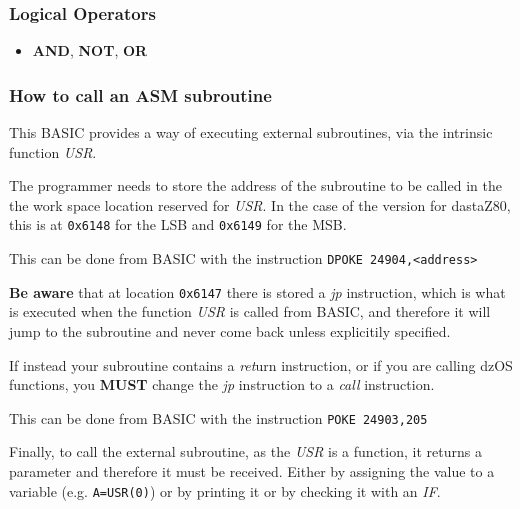         \subsubsection{Logical Operators}

        \begin{itemize}
            \item \textbf{AND}, \textbf{NOT}, \textbf{OR}
        \end{itemize}

        \subsubsection{How to call an ASM subroutine}

        This BASIC provides a way of executing external subroutines, via the
        intrinsic function \textit{USR}.

        The programmer needs to store the address of the subroutine to be called in
        the the work space location reserved for \textit{USR}. In the case of the
        version for dastaZ80, this is at \texttt{0x6148} for the LSB and
        \texttt{0x6149} for the MSB.

        This can be done from BASIC with the instruction \texttt{DPOKE 24904,<address>}

        \textbf{Be aware} that at location \texttt{0x6147} there is stored a
        \textit{jp} instruction, which is what is executed when the function
        \textit{USR} is called from BASIC, and therefore it will jump to the
        subroutine and never come back unless explicitily specified.

        If instead your subroutine contains a \textit{ret}urn instruction, or if you
        are calling dzOS functions, you \textbf{MUST} change the \textit{jp}
        instruction to a \textit{call} instruction.

        This can be done from BASIC with the instruction \texttt{POKE 24903,205}

        Finally, to call the external subroutine, as the \textit{USR} is a function,
        it returns a parameter and therefore it must be received. Either by assigning
        the value to a variable (e.g. \texttt{A=USR(0)}) or by printing it or by
        checking it with an \textit{IF}.

